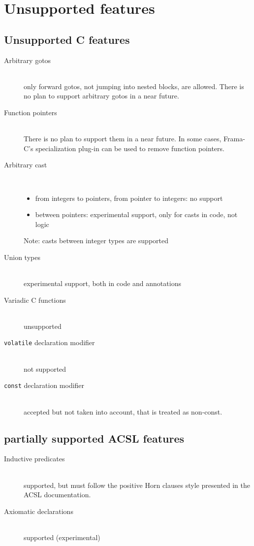 \documentclass[a4paper,11pt,twoside,openright]{report}
\begin{document}
\section{Unsupported features}

\subsection{Unsupported C features}

\begin{description}
\item[Arbitrary gotos] ~\\
  only forward gotos, not jumping into nested
  blocks, are allowed. There is no plan to support arbitrary gotos in
  a near future.
\item[Function pointers] ~\\
  There is no plan to support them in a near
  future. In some cases, Frama-C's specialization plug-in can be used to
  remove function pointers.
\item[Arbitrary cast] ~\\
  \begin{itemize}
  \item from integers to pointers, from pointer to integers: no support
  \item between pointers: experimental support, only for casts in code, not logic
  \end{itemize}
  Note: casts between integer types are supported
\item[Union types] ~\\
  experimental support, both in code and annotations
\item[Variadic C functions] ~\\
  unsupported

\item[\texttt{volatile} declaration modifier]~\\
  not supported
\item[\texttt{const} declaration modifier]~\\
  accepted but not taken into account, that is treated as non-const.

\end{description}


\subsection{partially supported ACSL features}

\begin{description}
\item[Inductive predicates] ~\\
  supported, but must follow the positive
  Horn clauses style presented in the ACSL documentation.
\item[Axiomatic declarations] ~\\
  supported (experimental)
\end{description}
\end{document}
